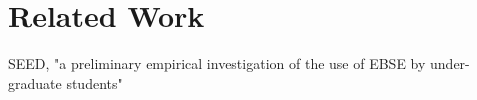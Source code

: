 \section{Related Work}
SEED, "a preliminary empirical investigation of the use of EBSE by under-graduate students"